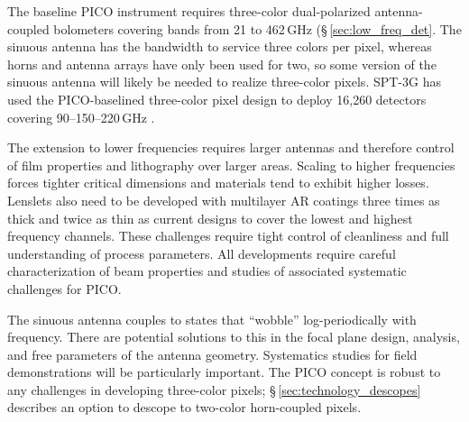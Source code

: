 
\costfootnote

The baseline PICO instrument requires three-color dual-polarized
antenna-coupled bolometers covering bands from 21 to 462\,GHz 
(\S\,\ref{sec:low_freq_det}.  The sinuous antenna has the
bandwidth to service three colors per pixel, whereas horns and antenna
arrays have only been used for two, so some version of the sinuous
antenna will likely be needed to realize three-color pixels.  SPT-3G
has used the PICO-baselined three-color pixel design to deploy 16,260
detectors covering 90--150--220\,GHz \citep{Dutcher2018}.

The extension to lower frequencies requires larger antennas and
therefore control of film properties and lithography over larger
areas. Scaling to higher frequencies forces tighter critical
dimensions and materials tend to exhibit higher losses. Lenslets also
need to be developed with multilayer AR coatings three times as thick
and twice as thin as current designs to cover the lowest and highest
frequency channels. These challenges require tight control of
cleanliness and full understanding of process parameters. All
developments require careful characterization of beam properties and
studies of associated systematic challenges for PICO.

The sinuous antenna couples to
states that ``wobble'' log-periodically with frequency. There are
potential solutions to this in the focal plane design, analysis, and
free parameters of the antenna geometry.  Systematics studies for field
demonstrations will be particularly important. The PICO concept is
robust to any challenges in developing three-color pixels;
\S\,\ref{sec:technology_descopes} describes an option to descope to
two-color horn-coupled pixels.

